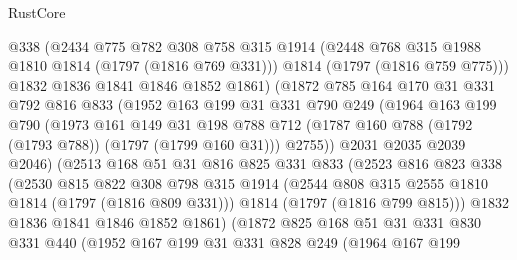 \begin{lexlean}{RustCore}
\begin{coremodule}
                @338
                (@2434
                  @775
                  @782
                  @308
                  @758
                  @315
                  @1914
                  (@2448 @768 @315 @1988 @1810 @1814 (@1797 (@1816 @769 @331)))
                  @1814
                  (@1797 (@1816 @759 @775)))
                @1832
                @1836
                @1841
                @1846
                @1852
                @1861)
              (@1872
                @785
                @164
                @170
                @31
                @331
                @792
                @816
                @833
                (@1952
                  @163
                  @199
                  @31
                  @331
                  @790
                  @249
                  (@1964
                    @163
                    @199
                    @790
                    (@1973
                      @161
                      @149
                      @31
                      @198
                      @788
                      @712
                      (@1787 @160 @788 (@1792 (@1793 @788)) (@1797 (@1799 @160 @31)))
                      @2755))
                  @2031
                  @2035
                  @2039
                  @2046)
                (@2513
                  @168
                  @51
                  @31
                  @816
                  @825
                  @331
                  @833
                  (@2523
                    @816
                    @823
                    @338
                    (@2530
                      @815
                      @822
                      @308
                      @798
                      @315
                      @1914
                      (@2544 @808 @315 @2555 @1810 @1814 (@1797 (@1816 @809 @331)))
                      @1814
                      (@1797 (@1816 @799 @815)))
                    @1832
                    @1836
                    @1841
                    @1846
                    @1852
                    @1861)
                  (@1872
                    @825
                    @168
                    @51
                    @31
                    @331
                    @830
                    @331
                    @440
                    (@1952
                      @167
                      @199
                      @31
                      @331
                      @828
                      @249
                      (@1964
                        @167
                        @199

\end{coremodule}
\end{lexlean}
